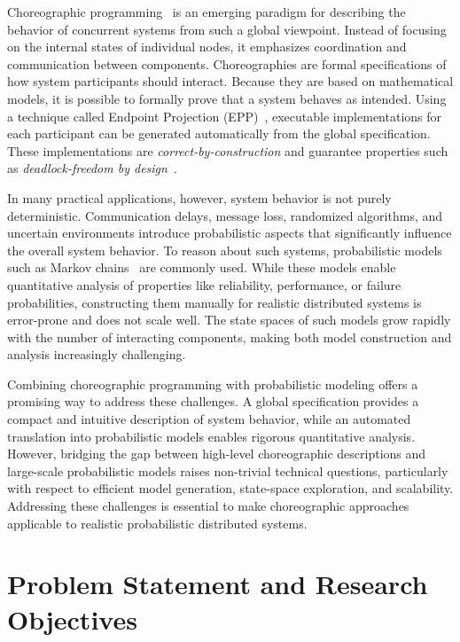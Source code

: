 Choreographic programming~\cite{Montesi2023} is an emerging paradigm for describing the behavior of concurrent systems from such a global viewpoint. Instead of focusing on the internal states of individual nodes, it emphasizes coordination and communication between components. Choreographies are formal specifications of how system participants should interact. Because they are based on mathematical models, it is possible to formally prove that a system behaves as intended. Using a technique called Endpoint Projection (EPP)~\cite{Giallorenzo2018}, executable implementations for each participant can be generated automatically from the global specification. These implementations are \emph{correct-by-construction} and guarantee properties such as \emph{deadlock-freedom by design}~\cite{Giallorenzo2018,CarboneVeschetti}.

In many practical applications, however, system behavior is not purely deterministic. Communication delays, message loss, randomized algorithms, and uncertain environments introduce probabilistic aspects that significantly influence the overall system behavior. To reason about such systems, probabilistic models such as Markov chains~\cite{Kwiatkowska2018,Norris1997MarkovChains} are commonly used. While these models enable quantitative analysis of properties like reliability, performance, or failure probabilities, constructing them manually for realistic distributed systems is error-prone and does not scale well. The state spaces of such models grow rapidly with the number of interacting components, making both model construction and analysis increasingly challenging.

Combining choreographic programming with probabilistic modeling offers a promising way to address these challenges. A global specification provides a compact and intuitive description of system behavior, while an automated translation into probabilistic models enables rigorous quantitative analysis. However, bridging the gap between high-level choreographic descriptions and large-scale probabilistic models raises non-trivial technical questions, particularly with respect to efficient model generation, state-space exploration, and scalability. Addressing these challenges is essential to make choreographic approaches applicable to realistic probabilistic distributed systems.

\section{Problem Statement and Research Objectives}

